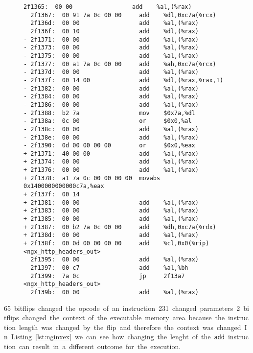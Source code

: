 \begin{figure}
\begin{minipage}{\linewidth}
\begin{lstlisting}[style=diff,
                   caption={Diff of the disassembly for a bitflip applied to
the \texttt{nginx} binary in order to bypass the credential check. The
\texttt{add} instruction is prefixed with a \texttt{0x40}, which is the Intel
REX prefix used to change addressing modes. This prefix changes the computation
before the jump to \texttt{ngx\_http\_headers\_out} at address
\texttt{0x2f1399}.},
label=lst:nginxex]
  2f1365:  00 00                 add    %al,(%rax)
  2f1367:  00 91 7a 0c 00 00     add    %dl,0xc7a(%rcx)
  2f136d:  00 00                 add    %al,(%rax)
  2f136f:  00 10                 add    %dl,(%rax)
- 2f1371:  00 00                 add    %al,(%rax)
- 2f1373:  00 00                 add    %al,(%rax)
- 2f1375:  00 00                 add    %al,(%rax)
- 2f1377:  00 a1 7a 0c 00 00     add    %ah,0xc7a(%rcx)
- 2f137d:  00 00                 add    %al,(%rax)
- 2f137f:  00 14 00              add    %dl,(%rax,%rax,1)
- 2f1382:  00 00                 add    %al,(%rax)
- 2f1384:  00 00                 add    %al,(%rax)
- 2f1386:  00 00                 add    %al,(%rax)
- 2f1388:  b2 7a                 mov    $0x7a,%dl
- 2f138a:  0c 00                 or     $0x0,%al
- 2f138c:  00 00                 add    %al,(%rax)
- 2f138e:  00 00                 add    %al,(%rax)
- 2f1390:  0d 00 00 00 00        or     $0x0,%eax
+ 2f1371:  40 00 00              add    %al,(%rax)
+ 2f1374:  00 00                 add    %al,(%rax)
+ 2f1376:  00 00                 add    %al,(%rax)
+ 2f1378:  a1 7a 0c 00 00 00 00  movabs 0x1400000000000c7a,%eax
+ 2f137f:  00 14
+ 2f1381:  00 00                 add    %al,(%rax)
+ 2f1383:  00 00                 add    %al,(%rax)
+ 2f1385:  00 00                 add    %al,(%rax)
+ 2f1387:  00 b2 7a 0c 00 00     add    %dh,0xc7a(%rdx)
+ 2f138d:  00 00                 add    %al,(%rax)
+ 2f138f:  00 0d 00 00 00 00     add    %cl,0x0(%rip)  <ngx_http_headers_out>
  2f1395:  00 00                 add    %al,(%rax)
  2f1397:  00 c7                 add    %al,%bh
  2f1399:  7a 0c                 jp     2f13a7  <ngx_http_headers_out>
  2f139b:  00 00                 add    %al,(%rax)
\end{lstlisting}
\end{minipage}
\end{figure}

\SI{65} bitflips changed the opcode of an instruction \SI{231} changed
parameters. \SI{2} bitflips changed the context of the executable memory area
because the instruction length was changed by the flip and therefore the context
was changed. In Listing~\ref{lst:nginxex} we can see how changing the lenght of
the \texttt{add} instruction can result in a different outcome for the
execution.

